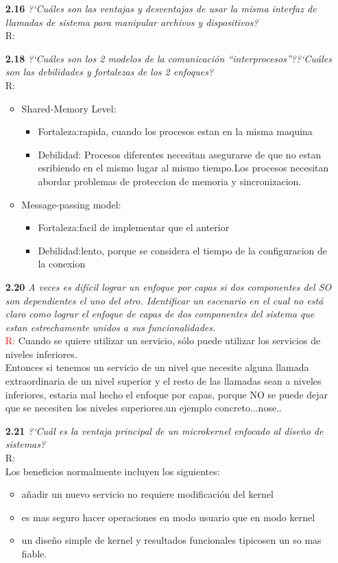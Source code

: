 \begin{itemize}
\item[\textbf{2.16}]\emph{?`Cu\'ales son las ventajas y desventajas de usar la misma interfaz de llamadas de sistema para manipular archivos y dispositivos?}\\
R:\\
\item[\textbf{2.18}]\emph{?`Cu\'ales son los 2 modelos de la comunicaci\'on ``interprocesos''??`Cu\'ales son las debilidades y fortalezas de los 2 enfoques?}\\
R:
\begin{itemize}
	\item Shared-Memory Level:
		\begin{itemize}
			\item Fortaleza:rapida, cuando los procesos estan en la misma maquina
			\item Debilidad: Procesos diferentes necesitan asegurarse de que no estan esribiendo en el mismo lugar al mismo tiempo.Los procesos necesitan abordar problemas de proteccion de memoria y sincronizacion.
		\end{itemize}
	\item Message-passing model:
		\begin{itemize}
	       		\item Fortaleza:facil de implementar que el anterior
	       		\item Debilidad:lento, porque se considera el tiempo de la configuracion de la conexion
	       	\end{itemize}
\end{itemize}

\item[\textbf{2.20}]\emph{A veces es difícil lograr un enfoque por capas si dos componentes del SO son dependientes el uno del otro. 
Identificar un escenario en el cual no est\'a claro como lograr el enfoque de capas de dos componentes del sistema que estan estrechamente unidos a sus funcionalidades.}\\
\textcolor{red}{R:}
Cuando se quiere utilizar un servicio, s\'olo puede utilizar los servicios de niveles inferiores.\\
Entonces si tenemos un servicio de un nivel que necesite alguna llamada extraordinaria de un nivel superior y el resto de las llamadas sean a niveles inferiores, estaria mal hecho el enfoque por capas, porque NO se puede dejar que se necesiten los niveles superiores.un ejemplo concreto...nose..

\item[\textbf{2.21}]\emph{?`Cu\'al es la ventaja principal de un microkernel enfocado al diseño de sistemas?}\\
R:\\
Los beneficios normalmente incluyen los siguientes:
\begin{itemize}
	\item a\~nadir un nuevo servicio no requiere modificaci\'on del kernel
	\item es mas seguro hacer operaciones en modo usuario que en modo kernel
	\item un dise\~no simple de kernel y resultados funcionales tipicosen un so mas fiable.
\end{itemize}


\end{itemize}
